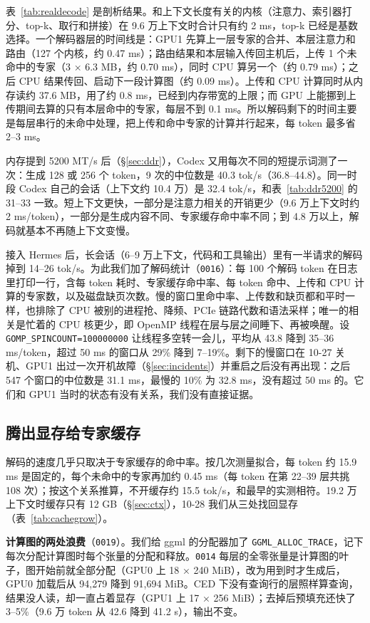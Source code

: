\documentclass[11pt,a4paper]{article}
\newcommand{\code}[1]{\texttt{#1}}
\newcommand{\tps}{tok/s}
\begin{document}
表~\ref{tab:realdecode} 是剖析结果。和上下文长度有关的内核（注意力、索引器打分、top-k、取行和拼接）在 9.6 万上下文时合计只有约 2 ms，top-k 已经是基数选择。一个解码器层的时间线是：GPU1 先算上一层专家的合并、本层注意力和路由（127 个内核，约 0.47 ms）；路由结果和本层输入传回主机后，上传 1 个未命中的专家（3 × 6.3 MB，约 0.70 ms），同时 CPU 算另一个（约 0.79 ms）；之后 CPU 结果传回、启动下一段计算图（约 0.09 ms）。上传和 CPU 计算同时从内存读约 37.6 MB，用了约 0.8 ms，已经到内存带宽的上限；而 GPU 上能挪到上传期间去算的只有本层命中的专家，每层不到 0.1 ms。所以解码剩下的时间主要是每层串行的未命中处理，把上传和命中专家的计算并行起来，每 token 最多省 2--3 ms。

内存提到 5200 MT/s 后（\S\ref{sec:ddr}），Codex 又用每次不同的短提示词测了一次：生成 128 或 256 个 token，9 次的中位数是 40.3 \tps{}（36.8--44.8）。同一时段 Codex 自己的会话（上下文约 10.4 万）是 32.4 \tps{}，和表~\ref{tab:ddr5200} 的 31--33 一致。短上下文更快，一部分是注意力相关的开销更少（9.6 万上下文时约 2 ms/token），一部分是生成内容不同、专家缓存命中率不同；到 4.8 万以上，解码就基本不再随上下文变慢。

接入 Hermes 后，长会话（6--9 万上下文，代码和工具输出）里有一半请求的解码掉到 14--26 \tps{}。为此我们加了解码统计（\code{0016}）：每 100 个解码 token 在日志里打印一行，含每 token 耗时、专家缓存命中率、每 token 命中、上传和 CPU 计算的专家数，以及磁盘缺页次数。慢的窗口里命中率、上传数和缺页都和平时一样，也排除了 CPU 被别的进程抢、降频、PCIe 链路代数和语法采样；唯一的相关是忙着的 CPU 核更少，即 OpenMP 线程在层与层之间睡下、再被唤醒。设 \code{GOMP\_SPINCOUNT=100000000} 让线程多空转一会儿，平均从 43.8 降到 35--36 ms/token，超过 50 ms 的窗口从 29\% 降到 7--19\%。剩下的慢窗口在 10-27 关机、GPU1 出过一次开机故障（\S\ref{sec:incidents}）并重启之后没有再出现：之后 547 个窗口的中位数是 31.1 ms，最慢的 10\% 为 32.8 ms，没有超过 50 ms 的。它们和 GPU1 当时的状态有没有关系，我们没有直接证据。

\subsection{腾出显存给专家缓存}
\label{sec:gpu0cache}

解码的速度几乎只取决于专家缓存的命中率。按几次测量拟合，每 token 约 15.9 ms 是固定的，每个未命中的专家再加约 0.45 ms（每 token 在第 22--39 层共挑 108 次）；按这个关系推算，不开缓存约 15.5 \tps{}，和最早的实测相符。19.2 万上下文时缓存只有 12 GB（\S\ref{sec:ctx}），10-28 我们从三处找回显存（表~\ref{tab:cachegrow}）。

\textbf{计算图的两处浪费}（\code{0019}）。我们给 ggml 的分配器加了 \code{GGML\_ALLOC\_TRACE}，记下每次分配计算图时每个张量的分配和释放。\code{0014} 每层的全零张量是计算图的叶子，图开始前就全部分配（GPU0 上 18 × 240 MiB），改为用到时才生成后，GPU0 加载后从 94,279 降到 91,694 MiB。CED 下没有查询行的层照样算查询，结果没人读，却一直占着显存（GPU1 上 17 × 256 MiB）；去掉后预填充还快了 3--5\%（9.6 万 token 从 42.6 降到 41.2 s），输出不变。
\end{document}
